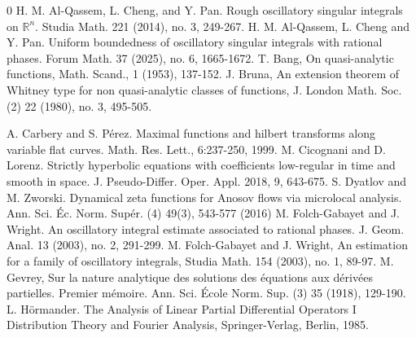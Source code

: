 \documentclass[11pt]{amsart}
\newcommand{\R}{\mathbb{R}}
\newcommand{\1}{{\rm 1\hspace*{-0.4ex}%
			\rule{0.1ex}{1.52ex}\hspace*{0.2ex}}}
\numberwithin{equation}{section}
\begin{document}

\begin{thebibliography}{0}
	H. M. Al-Qassem, L. Cheng, and Y. Pan. Rough oscillatory singular integrals on $\R^n$. Studia Math. 221 (2014), no. 3, 249-267.
	H. M. Al-Qassem, L. Cheng and Y. Pan. Uniform boundedness of oscillatory singular integrals with rational phases.
	Forum Math. 37 (2025), no. 6, 1665-1672.
	T. Bang, On quasi-analytic functions, Math. Scand., 1 (1953), 137-152.
	J. Bruna, An extension theorem of Whitney type for non quasi-analytic classes of functions, J. London Math. Soc. (2) 22 (1980), no. 3, 495-505.
	
	A. Carbery and S. P\'erez. Maximal functions and hilbert transforms along variable flat curves. Math. Res. Lett., 6:237-250, 1999.
	M. Cicognani and  D. Lorenz. Strictly hyperbolic equations with coefficients low-regular in time and smooth in space. J. Pseudo-Differ.
	Oper. Appl. 2018, 9, 643-675.
	S. Dyatlov and M. Zworski.  Dynamical zeta functions for Anosov flows via microlocal analysis. Ann. Sci.
	Éc. Norm. Supér. (4) 49(3), 543-577 (2016)
	M. Folch-Gabayet and J. Wright. An oscillatory integral estimate associated to rational phases.
	J. Geom. Anal. 13 (2003), no. 2, 291-299.
	M. Folch-Gabayet and J. Wright, An estimation for a family of oscillatory integrals, Studia Math. 154 (2003), no. 1, 89-97. 
	M. Gevrey, Sur la nature analytique des solutions des équations aux dérivées partielles. Premier mémoire.
	Ann. Sci. École Norm. Sup. (3) 35 (1918), 129-190.
	L. H\"ormander. The Analysis of Linear Partial Differential Operators I Distribution Theory and
	Fourier Analysis, Springer-Verlag, Berlin, 1985.


\end{thebibliography}
\end{document}
